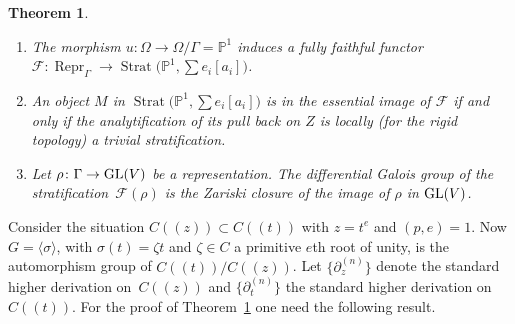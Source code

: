 \documentclass[pdftex]{sigma}
\numberwithin{equation}{section}
\newtheorem{Theorem}{Theorem}[section]
\begin{document}
 \begin{Theorem}\label{5.1}\quad
 \begin{enumerate}\itemsep=0pt
\item[$(1)$] The morphism $u\colon \Omega \rightarrow \Omega/\Gamma=\mathbb{P}^1$ induces a fully faithful functor $\mathcal{F}\colon \operatorname{Repr}_\Gamma \rightarrow \operatorname{Strat}\big(\mathbb{P}^1,\allowbreak \sum e_i[a_i]\big)$.
 \item[$(2)$] An object $M$ in $\operatorname{Strat}\big(\mathbb{P}^1,\sum e_i[a_i]\big)$ is in the essential image of $\mathcal{F}$ if and only if the analytification of its pull back on $Z$ is locally (for the rigid topology) a trivial stratification.
 \item[$(3)$] Let $\rho\colon \Gamma \rightarrow {\rm GL}(V)$ be a representation. The differential Galois group of the stratifica\-tion~$\mathcal{F}(\rho)$ is the Zariski closure of the image of $\rho$ in ${\rm GL}(V)$.
 \end{enumerate}
 \end{Theorem}

 Consider the situation $C((z))\subset C((t))$ with $z=t^e$ and $(p,e)=1$. Now $G=\langle \sigma \rangle$, with $\sigma (t)=\zeta t$ and $\zeta \in C$ a primitive $e$th root of unity, is the automorphism group of $C((t))/C((z))$. Let $\big\{\partial _z^{(n)}\big\}$ denote the standard higher derivation on~$C((z))$ and $\big\{\partial _t^{(n)}\big\}$ the standard higher derivation on $C((t))$. For the proof of Theorem~\ref{5.1} one need the following result.
\end{document}
